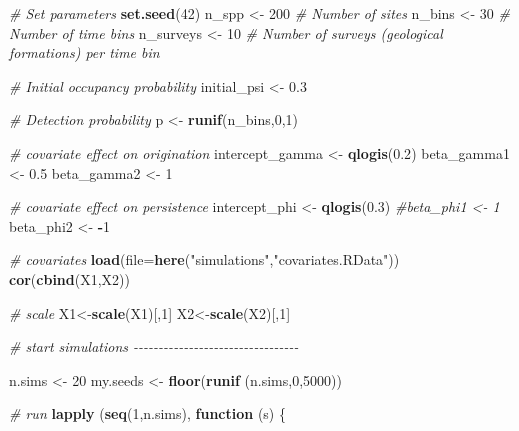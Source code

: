 \documentclass[
]{article}
\newenvironment{Shaded}{\begin{snugshade}}{\end{snugshade}}
\newcommand{\AttributeTok}[1]{\textcolor[rgb]{0.13,0.29,0.53}{#1}}
\newcommand{\CommentTok}[1]{\textcolor[rgb]{0.56,0.35,0.01}{\textit{#1}}}
\newcommand{\ControlFlowTok}[1]{\textcolor[rgb]{0.13,0.29,0.53}{\textbf{#1}}}
\newcommand{\DecValTok}[1]{\textcolor[rgb]{0.00,0.00,0.81}{#1}}
\newcommand{\FloatTok}[1]{\textcolor[rgb]{0.00,0.00,0.81}{#1}}
\newcommand{\FunctionTok}[1]{\textcolor[rgb]{0.13,0.29,0.53}{\textbf{#1}}}
\newcommand{\NormalTok}[1]{#1}
\newcommand{\OtherTok}[1]{\textcolor[rgb]{0.56,0.35,0.01}{#1}}
\newcommand{\SpecialCharTok}[1]{\textcolor[rgb]{0.81,0.36,0.00}{\textbf{#1}}}
\newcommand{\StringTok}[1]{\textcolor[rgb]{0.31,0.60,0.02}{#1}}
\begin{document}
{\begin{Shaded}
\begin{Highlighting}[]
\CommentTok{\# Set parameters}
\FunctionTok{set.seed}\NormalTok{(}\DecValTok{42}\NormalTok{)}
\NormalTok{n\_spp }\OtherTok{\textless{}{-}} \DecValTok{200}  \CommentTok{\# Number of sites}
\NormalTok{n\_bins }\OtherTok{\textless{}{-}} \DecValTok{30}   \CommentTok{\# Number of time bins}
\NormalTok{n\_surveys }\OtherTok{\textless{}{-}} \DecValTok{10}  \CommentTok{\# Number of surveys (geological formations) per time bin}

\CommentTok{\# Initial occupancy probability}
\NormalTok{initial\_psi }\OtherTok{\textless{}{-}} \FloatTok{0.3}

\CommentTok{\# Detection probability}
\NormalTok{p }\OtherTok{\textless{}{-}} \FunctionTok{runif}\NormalTok{(n\_bins,}\DecValTok{0}\NormalTok{,}\DecValTok{1}\NormalTok{)  }

\CommentTok{\# covariate effect on origination}
\NormalTok{intercept\_gamma }\OtherTok{\textless{}{-}} \FunctionTok{qlogis}\NormalTok{(}\FloatTok{0.2}\NormalTok{) }
\NormalTok{beta\_gamma1 }\OtherTok{\textless{}{-}} \FloatTok{0.5}
\NormalTok{beta\_gamma2 }\OtherTok{\textless{}{-}} \DecValTok{1}

\CommentTok{\# covariate effect on persistence}
\NormalTok{intercept\_phi }\OtherTok{\textless{}{-}} \FunctionTok{qlogis}\NormalTok{(}\FloatTok{0.3}\NormalTok{)  }
\CommentTok{\#beta\_phi1 \textless{}{-} 1}
\NormalTok{beta\_phi2 }\OtherTok{\textless{}{-}} \SpecialCharTok{{-}}\DecValTok{1}

\CommentTok{\# covariates}
\FunctionTok{load}\NormalTok{(}\AttributeTok{file=}\FunctionTok{here}\NormalTok{(}\StringTok{"simulations"}\NormalTok{,}\StringTok{"covariates.RData"}\NormalTok{))}
\FunctionTok{cor}\NormalTok{(}\FunctionTok{cbind}\NormalTok{(X1,X2))}

\CommentTok{\# scale}
\NormalTok{X1}\OtherTok{\textless{}{-}}\FunctionTok{scale}\NormalTok{(X1)[,}\DecValTok{1}\NormalTok{]}
\NormalTok{X2}\OtherTok{\textless{}{-}}\FunctionTok{scale}\NormalTok{(X2)[,}\DecValTok{1}\NormalTok{]}


\CommentTok{\# start simulations {-}{-}{-}{-}{-}{-}{-}{-}{-}{-}{-}{-}{-}{-}{-}{-}{-}{-}{-}{-}{-}{-}{-}{-}{-}{-}{-}{-}{-}{-}{-}{-}{-}}

\NormalTok{n.sims }\OtherTok{\textless{}{-}} \DecValTok{20}
\NormalTok{my.seeds }\OtherTok{\textless{}{-}} \FunctionTok{floor}\NormalTok{(}\FunctionTok{runif}\NormalTok{ (n.sims,}\DecValTok{0}\NormalTok{,}\DecValTok{5000}\NormalTok{))}

\CommentTok{\# run}
\FunctionTok{lapply}\NormalTok{ (}\FunctionTok{seq}\NormalTok{(}\DecValTok{1}\NormalTok{,n.sims), }\ControlFlowTok{function}\NormalTok{ (s) \{}
  

\end{Highlighting}
\end{Shaded}}
\end{document}
